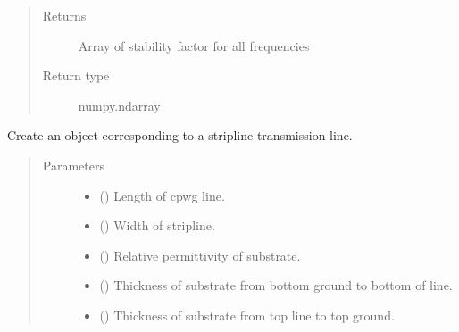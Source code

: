 \documentclass[letterpaper,10pt,english]{sphinxmanual}
\begin{document}
\begin{fulllineitems}
\begin{fulllineitems}
\begin{quote}
\begin{description}
\item[{Returns}] \leavevmode
Array of stability factor for all frequencies

\item[{Return type}] \leavevmode
numpy.ndarray

\end{description}\end{quote}

\end{fulllineitems}


\begin{fulllineitems}
\label{\detokenize{touchstone:touchstone.spfile.stripline}}
Create an  object corresponding to a stripline transmission line.
\begin{quote}\begin{description}
\item[{Parameters}] \leavevmode\begin{itemize}
\item {} 
 () \textendash{} Length of cpwg line.

\item {} 
 () \textendash{} Width of stripline.

\item {} 
 () \textendash{} Relative permittivity of substrate.

\item {} 
 () \textendash{} Thickness of substrate from bottom ground to bottom of line.

\item {} 
 () \textendash{} Thickness of substrate from top line to top ground.


\end{itemize}
\end{description}
\end{quote}
\end{fulllineitems}
\end{fulllineitems}
\end{document}
